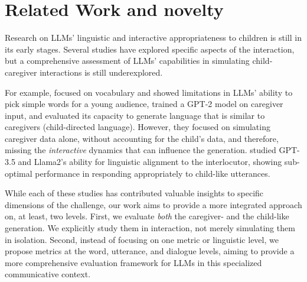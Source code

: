 \section{Related Work and novelty}

Research on LLMs' linguistic and interactive appropriateness to children is still in its early stages. Several studies have explored specific aspects of the interaction, but a comprehensive assessment of LLMs' capabilities in simulating child-caregiver interactions is still underexplored.

For example,  \citet{valentini2023automatic} focused on vocabulary and showed limitations in LLMs' ability to pick simple words for a young audience,
\citet{rasanen2024age} trained a GPT-2 model on caregiver input, and evaluated its capacity to generate language that is similar to caregivers (child-directed language). However, they focused on simulating caregiver data alone, without accounting for the child's data, and therefore, missing the \textit{interactive} dynamics that can influence the generation. \citet{french2024aligning} studied GPT-3.5 and Llama2's ability for linguistic alignment to the interlocutor, showing sub-optimal performance in responding appropriately to child-like utterances. 

While each of these studies has contributed valuable insights to specific dimensions of the challenge, our work aims to provide a more integrated approach on, at least, two levels. First, we evaluate \textit{both} the caregiver- and the child-like generation. We explicitly study them in interaction, not merely simulating them in isolation. Second, instead of focusing on one metric or linguistic level, we propose metrics at the word, utterance, and dialogue levels, aiming to provide a more comprehensive evaluation framework for LLMs in this specialized communicative context.

 


